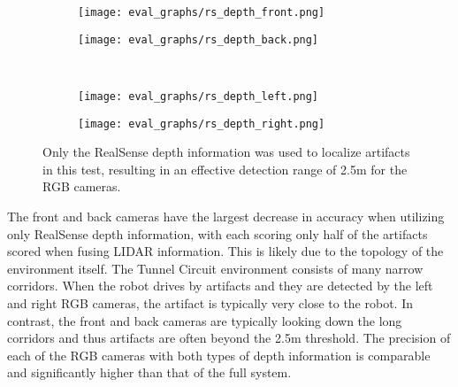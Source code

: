 \begin{figure}	
	\centering
		\begin{subfigure}{0.48\textwidth}
			\texttt{[image: eval\_graphs/rs\_depth\_front.png]}
			\label{rs_depth_front}
		\end{subfigure}
		\hfill
		\begin{subfigure}{0.48\textwidth}
			\texttt{[image: eval\_graphs/rs\_depth\_back.png]}
			\label{rs_depth_back}
		\end{subfigure}
		\\
		\begin{subfigure}{0.48\textwidth}
			\texttt{[image: eval\_graphs/rs\_depth\_left.png]}
			\label{rs_depth_left}
		\end{subfigure}
		\hfill
		\begin{subfigure}{0.48\textwidth}
			\texttt{[image: eval\_graphs/rs\_depth\_right.png]}
			\label{rs_depth_right}
		\end{subfigure}
	\caption[Single RGB sensor scores using only RealSense depth]{Only the RealSense depth information was used to localize artifacts in this test, resulting in an effective detection range of 2.5m for the RGB cameras.}
	\label{rs_depth_only}
\end{figure}

The front and back cameras have the largest decrease in accuracy when utilizing only RealSense depth information, with each scoring only half of the artifacts scored when fusing LIDAR information. This is likely due to the topology of the environment itself. The Tunnel Circuit environment consists of many narrow corridors. When the robot drives by artifacts and they are detected by the left and right RGB cameras, the artifact is typically very close to the robot. In contrast, the front and back cameras are typically looking down the long corridors and thus artifacts are often beyond the 2.5m threshold. The precision of each of the RGB cameras with both types of depth information is comparable and significantly higher than that of the full system.
